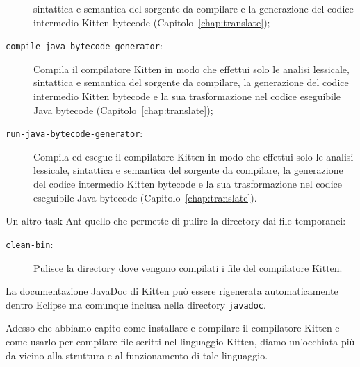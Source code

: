 \begin{description}
  sintattica e semantica del sorgente da compilare e la generazione del
  codice intermedio Kitten bytecode (Capitolo~\ref{chap:translate});
\item[\texttt{compile-java-bytecode-generator}:]
  Compila il compilatore Kitten in modo che effettui solo le analisi lessicale,
  sintattica e semantica del sorgente da compilare, la generazione del codice
  intermedio Kitten bytecode e la sua trasformazione nel codice eseguibile
  Java bytecode (Capitolo~\ref{chap:translate});
\item[\texttt{run-java-bytecode-generator}:]
  Compila ed esegue il compilatore Kitten in modo che effettui solo le analisi lessicale,
  sintattica e semantica del sorgente da compilare, la generazione del codice
  intermedio Kitten bytecode e la sua trasformazione nel codice eseguibile
  Java bytecode (Capitolo~\ref{chap:translate}).
\end{description}
%

Un altro task Ant \e quello che permette di pulire la directory dai file temporanei:
%
\begin{description}
\item[\texttt{clean-bin}:]
  Pulisce la directory dove vengono compilati i file del compilatore Kitten.
\end{description}

La documentazione JavaDoc di Kitten pu\`o essere rigenerata automaticamente dentro Eclipse
ma \e comunque inclusa nella directory \texttt{javadoc}.
%

Adesso che abbiamo capito come installare e compilare il compilatore
Kitten e come usarlo per compilare file scritti nel linguaggio Kitten,
diamo un'occhiata pi\`u da vicino alla struttura e al funzionamento di
tale linguaggio.
%
